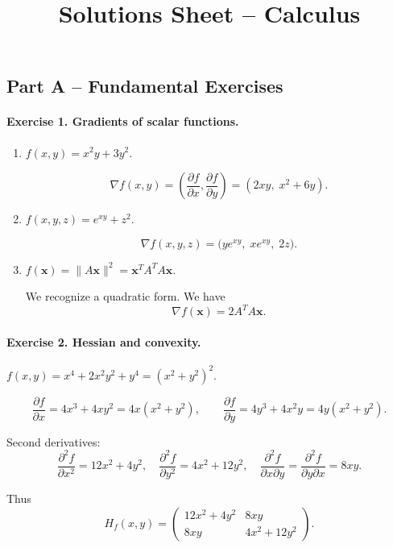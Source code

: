 \documentclass[11pt]{article}
\title{Solutions Sheet -- Calculus}
\author{}
\date{}
\begin{document}
\maketitle
\subsection*{Part A -- Fundamental Exercises}

\paragraph{Exercise 1. Gradients of scalar functions.}

\begin{enumerate}
\item \( f(x,y)=x^2y+3y^2 \).

\[
\nabla f(x,y)=\left(\frac{\partial f}{\partial x},\frac{\partial f}{\partial y}\right)
=(2xy,\;x^2+6y).
\]

\item \( f(x,y,z)=e^{xy}+z^2 \).

\[
\nabla f(x,y,z)=\big(y e^{xy},\; x e^{xy},\; 2z\big).
\]

\item \( f(\bm{x})=\|A\bm{x}\|^2=\bm{x}^T A^T A \bm{x} \).

We recognize a quadratic form. We have
\[
\nabla f(\bm{x})
= 2A^T A\bm{x}.
\]

\end{enumerate}

\bigskip

\paragraph{Exercise 2. Hessian and convexity.}

\( f(x,y)=x^4+2x^2y^2+y^4 = (x^2+y^2)^2. \)

\[
\frac{\partial f}{\partial x}=4x^3+4xy^2=4x(x^2+y^2),\qquad
\frac{\partial f}{\partial y}=4y^3+4x^2y=4y(x^2+y^2).
\]

Second derivatives:
\[
\frac{\partial^2 f}{\partial x^2}=12x^2+4y^2,\quad
\frac{\partial^2 f}{\partial y^2}=4x^2+12y^2,\quad
\frac{\partial^2 f}{\partial x\partial y}
=\frac{\partial^2 f}{\partial y\partial x}=8xy.
\]

Thus
\[
H_f(x,y)=
\begin{pmatrix}
12x^2+4y^2 & 8xy\\[4pt]
8xy & 4x^2+12y^2
\end{pmatrix}.
\]
\end{document}
